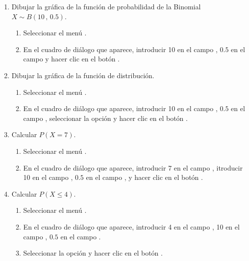 \begin{enumerate}[leftmargin=*]
\begin{enumerate}
\item Dibujar la gráfica de la función de probabilidad de la Binomial $X\sim B(10\,,\,0.5)$.
\begin{indicacion}{
\begin{enumerate}
\item Seleccionar el menú .
\item En el cuadro de diálogo que aparece, introducir 10 en el campo ,
$0.5$ en el campo  y hacer clic en el botón .
\end{enumerate}}
\end{indicacion}

\item Dibujar la gráfica de la función de distribución.
\begin{indicacion}{
\begin{enumerate}
\item Seleccionar el menú .
\item En el cuadro de diálogo que aparece, introducir 10 en el campo , $0.5$ en el campo
, seleccionar la opción  y hacer clic en el botón
.
\end{enumerate}}
\end{indicacion}

\item Calcular $P(X=7)$.
\begin{indicacion}{
\begin{enumerate}
\item Seleccionar el menú .
\item En el cuadro de diálogo que aparece, introducir 7 en el campo ,
itroducir 10 en el campo , $0.5$ en el campo , y hacer clic
en el botón .
\end{enumerate}}
\end{indicacion}

\item Calcular $P(X\leq 4)$.
\begin{indicacion}{
\begin{enumerate}
\item Seleccionar el menú .
\item En el cuadro de diálogo que aparece, introducir 4 en el campo , 10 en el campo
, $0.5$ en el campo .
\item Seleccionar la opción  y hacer clic en el botón .
\end{enumerate}}
\end{indicacion}


\end{enumerate}
\end{enumerate}
